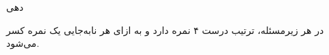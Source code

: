 
‌دهی{
	در هر زیرمسئله، ترتیب درست ۴ نمره دارد و به ازای هر نابه‌جایی یک نمره کسر می‌شود.

}












